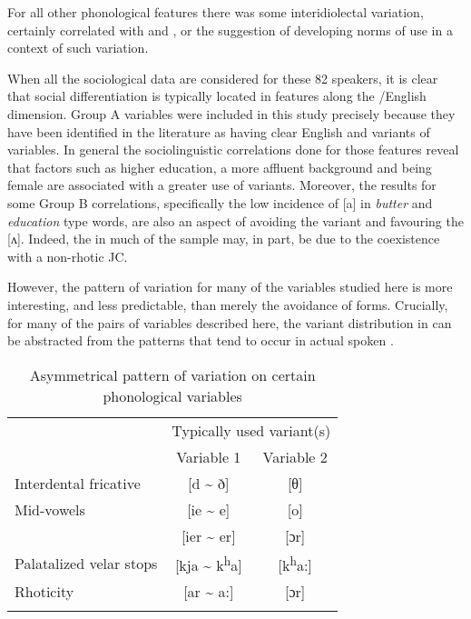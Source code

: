 For all other phonological features there was some interidiolectal variation, certainly correlated with  and , or the suggestion of developing norms of use in a context of such variation. 

When all the sociological data are considered for these 82 speakers, it is clear that social differentiation is typically located in features along the \slash English dimension.  Group A variables were included in this study precisely because they have been identified in the literature as having clear English and  variants of variables.  In general the sociolinguistic correlations done for those features reveal that factors such as higher education, a more affluent background and being female are associated with a greater use of  variants.  Moreover, the results for some Group B correlations, specifically the low incidence of [a] in \textit{butter} and \textit{education} type words, are also an aspect of avoiding the  variant and favouring the  [ʌ].  Indeed, the  in much of the sample may, in part, be due to the coexistence with a non-rhotic JC.  

However, the pattern of variation for many of the variables studied here is more interesting, and less predictable, than merely the avoidance of  forms.  Crucially, for many of the pairs of variables described here, the variant distribution in  can be abstracted from the patterns that tend to occur in actual spoken .

\begin{table}
\begin{tabular}{lcc}\lsptoprule
     &  \multicolumn{2}{c}{Typically used variant(s)}\\\cmidrule(lr){2-3}
                         &   Variable 1                          &  Variable 2\\\midrule
Interdental fricative   &    [d {\textasciitilde} ð]                       & [θ]  \\  
Mid-vowels              &    [ie {\textasciitilde} e]                      & [o]  \\
						&	 [ier {\textasciitilde} er]                    & [ɔr] \\
Palatalized velar stops &    [kja {\textasciitilde} k\textsuperscript{h}a] & [k\textsuperscript{h}a:]\\
Rhoticity               &  [ar {\textasciitilde} a:] & [ɔr]\\
\lspbottomrule
\end{tabular}
\caption{Asymmetrical pattern of variation on certain phonological variables\label{tab:3.55}}
\end{table}

